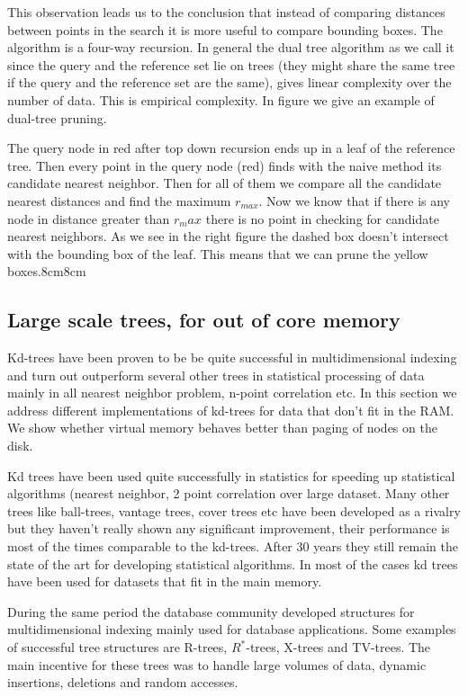 \documentclass[12pt,letterpaper,doublespaced,ETD,dvips,proposal]{gtthesis}
\begin{document}
\begin{Body}
This observation leads us to the conclusion that instead of
comparing distances between points in the search it is more useful
to compare bounding boxes. The algorithm is  a four-way recursion.
In general the dual tree algorithm as we call it since the query and
the reference set lie on trees (they might share the same tree if
the query and the reference set are the same), gives linear
complexity over the number of data. This is empirical complexity. In
figure we give an example of dual-tree pruning.

{The query node in red after top down recursion ends up in a leaf of
the reference tree. Then every point in the query node (red) finds
with the naive method its candidate nearest neighbor. Then for all
of them we compare all the candidate nearest distances and find the
maximum $r_{max}$. Now we know that if there is any node in distance
greater than $r_max$ there is no point in checking for candidate
nearest neighbors. As we see in the right figure the dashed box
doesn't intersect with the bounding box of the leaf. This means that
we can prune the yellow boxes.}{8cm}{8cm}

\subsection{Large scale trees, for out of core memory}
\label{Large_scale_trees}

Kd-trees have been proven to be be quite successful in
multidimensional indexing and turn out outperform several other
trees in statistical processing of data mainly in all nearest
neighbor problem, n-point correlation etc. In this section we
address different implementations of kd-trees for data that don't
fit in the RAM. We show whether virtual memory behaves better   than
paging of nodes on the disk.

Kd trees have been used quite successfully in statistics for
speeding up statistical algorithms (nearest neighbor, 2 point
correlation  over large dataset. Many other trees like ball-trees,
vantage trees, cover trees etc have been developed as a rivalry but
they haven't really shown any significant improvement, their
performance is most of the times comparable to the kd-trees. After
30 years they still remain the state of the art for developing
statistical algorithms. In most of the cases kd trees have been used
for datasets that fit in the main memory.

During the same period the database community developed structures
for multidimensional indexing mainly used for database applications.
Some examples of successful tree structures are R-trees,
$R^{*}$-trees, X-trees and TV-trees. The main incentive for these
trees was to handle large volumes of data, dynamic insertions,
deletions and random accesses.


\end{Body}
\end{document}
